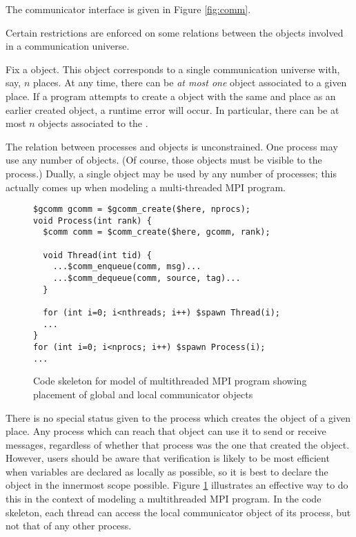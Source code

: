 The communicator interface is given in Figure \ref{fig:comm}.

Certain restrictions are enforced on some relations between the
objects involved in a communication universe.

Fix a \cgcomm{} object.  This object corresponds to a single
communication universe with, say, $n$ places.  At any time, there can
be \emph{at most one} \ccomm{} object associated to a given place.  If
a program attempts to create a \ccomm{} object with the same \cgcomm{}
and place as an earlier created \ccomm{} object, a runtime error will
occur.  In particular, there can be at most $n$ \ccomm{} objects
associated to the \cgcomm.

The relation between processes and \ccomm{} objects is unconstrained.
One process may use any number of \ccomm{} objects.  (Of course, those
objects must be visible to the process.)  Dually, a single \ccomm{}
object may be used by any number of processes; this actually comes up
when modeling a multi-threaded MPI program.

\begin{figure}
  \begin{small}
\begin{verbatim}
$gcomm gcomm = $gcomm_create($here, nprocs);
void Process(int rank) {
  $comm comm = $comm_create($here, gcomm, rank);

  void Thread(int tid) {
    ...$comm_enqueue(comm, msg)...
    ...$comm_dequeue(comm, source, tag)...
  }

  for (int i=0; i<nthreads; i++) $spawn Thread(i);
  ...
}
for (int i=0; i<nprocs; i++) $spawn Process(i);
...
\end{verbatim}
  \end{small}
  \caption{Code skeleton for model of multithreaded MPI program
    showing placement of global and local communicator objects}
  \label{fig:mpi-threads-comm}
\end{figure}

There is no special status given to the process which creates the
\ccomm{} object of a given place.  Any process which can reach that
\ccomm{} object can use it to send or receive messages, regardless of
whether that process was the one that created the \ccomm{} object.
However, users should be aware that verification is likely to be most
efficient when variables are declared as locally as possible, so it is
best to declare the \ccomm{} object in the innermost scope possible.
Figure \ref{fig:mpi-threads-comm} illustrates an effective way
to do this in the context of modeling a multithreaded MPI program.
In the code skeleton, each thread can access the local communicator
object of its process, but not that of any other process.



